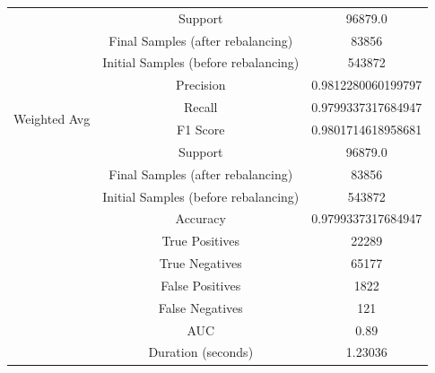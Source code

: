 \begin{longtable}{|c|c|c|}
 & Support & 96879.0 \\
 & Final Samples (after rebalancing) & 83856 \\
 & Initial Samples (before rebalancing) & 543872 \\
\hline
\multirow{4}{*}{Weighted Avg} & Precision & 0.9812280060199797 \\
 & Recall & 0.9799337317684947 \\
 & F1 Score & 0.9801714618958681 \\
 & Support & 96879.0 \\
 & Final Samples (after rebalancing) & 83856 \\
 & Initial Samples (before rebalancing) & 543872 \\
\hline
& Accuracy & 0.9799337317684947 \\ \hline
& True Positives & 22289 \\ \hline
& True Negatives & 65177 \\ \hline
& False Positives & 1822 \\ \hline
& False Negatives & 121 \\ \hline
& AUC & 0.89 \\ \hline
& Duration (seconds) & 1.23036 \\ \hline
\end{longtable}


